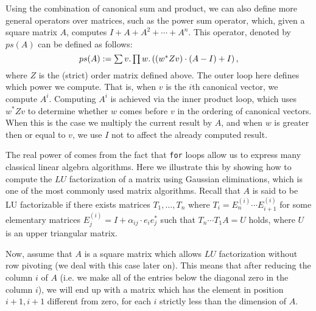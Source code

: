 Using the combination of canonical sum and product, we can also define more general operators over matrices, such as the power sum operator, which, given a square matrix $A$, computes $I + A + A^2 + \cdots + A^n$. This operator, denoted by $ps(A)$ can be defined as follows:
$$ps(A) := \textstyle\sum v.\textstyle\prod w. \left( (w^*Zv)\cdot (A-I) + I\right),$$
where $Z$ is the (strict) order matrix defined above. The outer loop here defines which power we compute. That is, when $v$ is the $i$th canonical vector, we compute $A^i$. Computing $A^i$ is achieved via the inner product loop, which uses $w^*Zv$ to determine whether $w$ comes before $v$ in the ordering of canonical vectors. When this is the case we multiply the current result by $A$, and when $w$ is greater then or equal to $v$, we use $I$ not to affect the already computed result.

\medskip

 The real power of \langfor comes from the fact that \texttt{for} loops allow us to express many classical linear algebra algorithms. Here we illustrate this by showing how to compute the $LU$ factorization of a matrix using Gaussian eliminations, which is one of the most commonly used matrix algorithms. Recall that $A$ is said to be LU factorizable if there exists matrices $T_1,\ldots, T_{n}$ where $T_i=E_{n}^{(i)}\cdots E_{i+1}^{(i)}$ for some elementary matrices $E_{j}^{(i)}=I+\alpha_{ij}\cdot e_{i}e_{j}^{*}$ such that $T_{n}\cdots T_1A=U$ holds, where $U$ is an upper triangular matrix.

Now, assume that $A$ is a square matrix which allows $LU$ factorization without row pivoting (we deal with this case later on). This means that after reducing the column $i$ of $A$ (i.e. we make all of the entries below the diagonal zero in the column $i$), we will end up with a matrix which has the element in position $i+1,i+1$ different from zero, for each $i$ strictly less than the dimension of $A$. 

